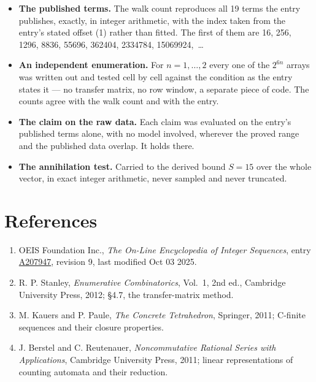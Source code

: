 \documentclass[11pt]{article}
\theoremstyle{definition}
\begin{document}
\begin{itemize}

\item {\bfseries The published terms.} The walk count reproduces all 19 terms the entry publishes, exactly, in integer arithmetic, with the index taken from the entry's stated offset (1) rather than fitted. The first of them are 16, 256, 1296, 8836, 55696, 362404, 2334784, 15069924,~\dots

\item {\bfseries An independent enumeration.} For $n = 1,\dots,2$ every one of the $2^{6n}$ arrays was written out and tested cell by cell against the condition as the entry states it --- no transfer matrix, no row window, a separate piece of code. The counts agree with the walk count and with the entry.

\item {\bfseries The claim on the raw data.} Each claim was evaluated on the entry's published terms alone, with no model involved, wherever the proved range and the published data overlap. It holds there.

\item {\bfseries The annihilation test.} Carried to the derived bound $S = 15$ over the whole vector, in exact integer arithmetic, never sampled and never truncated.

\end{itemize}

\section{References}

\begin{enumerate}

\item OEIS Foundation Inc., \emph{The On-Line Encyclopedia of Integer Sequences}, entry \href{https://oeis.org/A207947}{A207947}, revision 9, last modified Oct 03 2025.

\item R. P. Stanley, \emph{Enumerative Combinatorics}, Vol.~1, 2nd ed., Cambridge University Press, 2012; \S4.7, the transfer-matrix method.

\item M. Kauers and P. Paule, \emph{The Concrete Tetrahedron}, Springer, 2011; C-finite sequences and their closure properties.

\item J. Berstel and C. Reutenauer, \emph{Noncommutative Rational Series with Applications}, Cambridge University Press, 2011; linear representations of counting automata and their reduction.

\end{enumerate}
\end{document}

